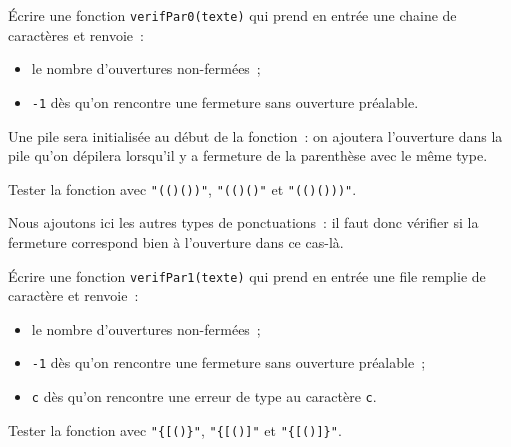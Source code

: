\UPSTIquestion Écrire une fonction \texttt{verifPar0(texte)} qui prend en entrée une chaine de caractères et renvoie~: 
\begin{itemize}
	\item le nombre d'ouvertures non-fermées~;
	\item \texttt{-1} dès qu'on rencontre une fermeture sans ouverture préalable.
\end{itemize}
Une pile sera initialisée au début de la fonction~: on ajoutera l'ouverture dans la pile qu'on dépilera lorsqu'il y a fermeture de la parenthèse avec le même type.

\UPSTIquestion Tester la fonction avec \texttt{"(()())"}, \texttt{"(()()"} et \texttt{"(()()))"}.

Nous ajoutons ici les autres types de ponctuations~: il faut donc vérifier si la fermeture correspond bien à l'ouverture dans ce cas-là. 

\UPSTIquestion Écrire une fonction \texttt{verifPar1(texte)} qui prend en entrée une file remplie de caractère et renvoie~: 
\begin{itemize}
	\item le nombre d'ouvertures non-fermées~; 
	\item \texttt{-1} dès qu'on rencontre une fermeture sans ouverture préalable~; 
	\item \texttt{c} dès qu'on rencontre une erreur de type au caractère \texttt{c}.
\end{itemize}

\UPSTIquestion Tester la fonction avec \texttt{"\{[()\}"}, \texttt{"\{[()]"} et \texttt{"\{[()]\}"}.

